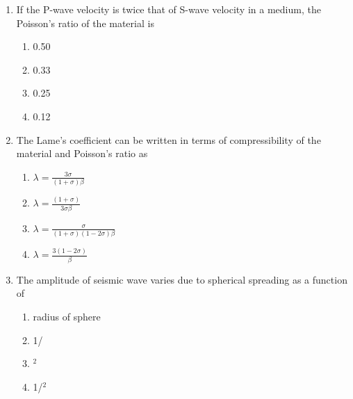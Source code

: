 \documentclass[journal,12pt,onecolumn]{IEEEtran}
\theoremstyle{remark}
\begin{document}
\begin{enumerate}
    \item If the P-wave velocity is twice that of S-wave velocity in a medium, the Poisson's ratio of the material is

    \hfill{}
    
    \begin{multicols}{4}
        \begin{enumerate}
            \item 0.50
            \item 0.33
            \item 0.25
            \item 0.12
        \end{enumerate}
    \end{multicols}

    \item The Lame's coefficient \brak{\text{$\lambda$}} can be written in terms of compressibility of the material \brak{\text{$\beta$}} and Poisson's ratio \brak{\text{$\sigma$}} as

    \hfill{}
    
    \begin{multicols}{2}
        \begin{enumerate}
            \item $\lambda=\frac{3\sigma}{(1+\sigma)\beta}$
            \item $\lambda=\frac{(1+\sigma)}{3\sigma\beta}$
            \item $\lambda=\frac{\sigma}{(1+\sigma)(1-2\sigma)\beta}$
            \item $\lambda=\frac{3(1-2\sigma)}{\beta}$
        \end{enumerate}
    \end{multicols}

    \item The amplitude of seismic wave varies due to spherical spreading as a function of

    \hfill{}
    
    \begin{multicols}{2}
        \begin{enumerate}
            \item radius of sphere
            \item 1/
            \item {}$^2$
            \item 1/$^2$
        \end{enumerate}
    \end{multicols}


\end{enumerate}
\end{document}
